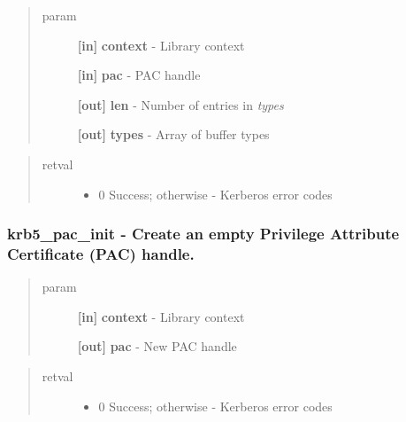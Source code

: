 \documentclass[letterpaper,10pt,english]{sphinxmanual}
\begin{document}
\begin{quote}\begin{description}
\item[{param}] \leavevmode
\textbf{{[}in{]}} \textbf{context} - Library context

\textbf{{[}in{]}} \textbf{pac} - PAC handle

\textbf{{[}out{]}} \textbf{len} - Number of entries in \emph{types}

\textbf{{[}out{]}} \textbf{types} - Array of buffer types

\end{description}\end{quote}
\begin{quote}\begin{description}
\item[{retval}] \leavevmode\begin{itemize}
\item {} 
0   Success; otherwise - Kerberos error codes

\end{itemize}

\end{description}\end{quote}


\subsubsection{krb5\_pac\_init -  Create an empty Privilege Attribute Certificate (PAC) handle.}
\label{appdev/refs/api/krb5_pac_init:krb5-pac-init-create-an-empty-privilege-attribute-certificate-pac-handle}\label{appdev/refs/api/krb5_pac_init::doc}

\begin{fulllineitems}
\label{appdev/refs/api/krb5_pac_init:krb5_pac_init}
\end{fulllineitems}

\begin{quote}\begin{description}
\item[{param}] \leavevmode
\textbf{{[}in{]}} \textbf{context} - Library context

\textbf{{[}out{]}} \textbf{pac} - New PAC handle

\end{description}\end{quote}
\begin{quote}\begin{description}
\item[{retval}] \leavevmode\begin{itemize}
\item {} 
0   Success; otherwise - Kerberos error codes

\end{itemize}

\end{description}\end{quote}
\end{document}
